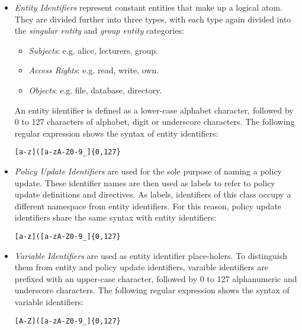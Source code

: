 \documentclass[10pt, twocolumn]{article}
\begin{document}
          \begin{itemize}
            \item
              {\em Entity Identifiers} represent constant entities that make up
              a logical atom. They are divided further into three types, with
              each type again divided into the {\em singular entity} and
              {\em group entity} categories:

              \begin{itemize}
                \item
                  {\em Subjects}: e.g. alice, lecturers, group.
                \item
                  {\em Access Rights}: e.g. read, write, own.
                \item
                  {\em Objects}: e.g. file, database, directory.
              \end{itemize}

              An entity identifier is defined as a lower-case alphabet
              character, followed by 0 to 127 characters of alphabet, digit or
              underscore characters. The following regular expression shows the
              syntax of entity identifiers:

              \begin{verbatim}[a-z]([a-zA-Z0-9_]{0,127}\end{verbatim}

            \item
              {\em Policy Update Identifiers} are used for the sole purpose of
              naming a policy update. These identifier names are then used as
              labels to refer to policy update definitions and directives. As
              labels, identifiers of this class occupy a different namespace
              from entity identifiers. For this reason, policy update
              identifiers share the same syntax with entity identifiers:

              \begin{verbatim}[a-z]([a-zA-Z0-9_]{0,127}\end{verbatim}

            \item
              {\em Variable Identifiers} are used as entity identifier
              place-holers. To distinguish them from entity and policy update
              identifiers, varaible identifiers are prefixed with an upper-case
              character, followed by 0 to 127 alphanumeric and underscore
              characters. The following regular expression shows the syntax of
              variable identifiers:

              \begin{verbatim}[A-Z]([a-zA-Z0-9_]{0,127}\end{verbatim}
          \end{itemize}
\end{document}
